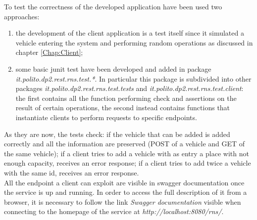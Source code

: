 To test the correctness of the developed application have been used two approaches:
\begin{enumerate}
  \item the development of the client application is a test itself since it simulated a vehicle entering the system and performing random operations as discussed in chapter \ref{Chap:Client};
  \item some basic junit test have been developed and added in package \textit{it.polito.dp2.rest.rns.test.*}. In particular this package is subdivided into other packages \textit{it.polito.dp2.rest.rns.test.tests} and \textit{it.polito.dp2.rest.rns.test.client}: the first contains all the function performing check and assertions on the result of certain operations, the second instead contains functions that instantiate clients to perform requests to specific endpoints.
\end{enumerate}
As they are now, the tests check: if the vehicle that can be added is added correctly and all the information are preserved (POST of a vehicle and GET of the same vehicle); if a client tries to add a vehicle with as entry a place with not enough capacity, receives an error response; if a client tries to add twice a vehicle with the same id, receives an error response.\\
All the endpoint a client can exploit are visible in swagger documentation once the service is up and running. In order to access the full description of it from a browser, it is necessary to follow the link \textit{Swagger documentation} visible when connecting to the homepage of the service at \textit{http://localhost:8080/rns/}.
